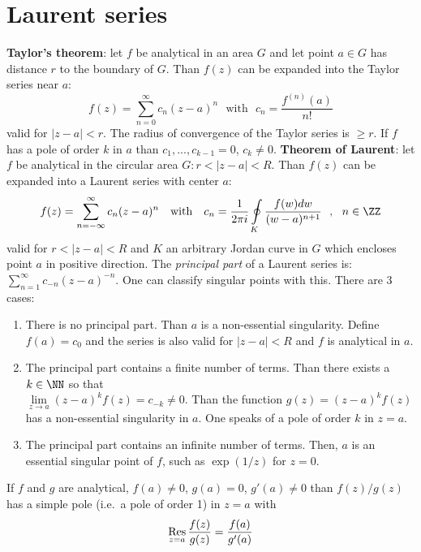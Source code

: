 \section{Laurent series}
{\bf Taylor's theorem}: let $f$ be analytical in an area $G$ and let point
$a\in G$ has distance $r$ to the boundary of $G$. Than $f(z)$ can be expanded
into the Taylor series near $a$:
\[
f(z)=\sum_{n=0}^\infty c_n(z-a)^n~~~\mbox{with}~~~c_n=\frac{f^{(n)}(a)}{n!}
\]
valid for $|z-a|<r$. The radius of convergence of the Taylor series is $\geq r$.
If $f$ has a pole of order $k$ in $a$ than $c_1,...,c_{k-1}=0$, $c_k\neq0$.
\npar
{\bf Theorem of Laurent}: let $f$ be analytical in the circular area
$G:r<|z-a|<R$. Than $f(z)$ can be expanded into a Laurent series with center
$a$:
\[
f(z)=\sum_{n=-\infty}^\infty c_n(z-a)^n~~~\mbox{with}~~~
c_n=\frac{1}{2\pi i}\oint\limits_K\frac{f(w)dw}{(w-a)^{n+1}}~~,~~n\in\ZZ
\]
valid for $r<|z-a|<R$ and $K$ an arbitrary Jordan curve in $G$ which encloses
point $a$ in positive direction.
\npar
The {\it principal part} of a Laurent series is: $\sum\limits_{n=1}^\infty c_{-n}(z-a)^{-n}$.
One can classify singular points with this. There are 3 cases:
\begin{enumerate}
\item There is no principal part. Than $a$ is a non-essential singularity.
      Define $f(a)=c_0$ and the series is also valid for $|z-a|<R$ and
      $f$ is analytical in $a$.
\item The principal part contains a finite number of terms. Than there exists
      a $k\in\NN$ so that\\ $\lim\limits_{z\rightarrow a}(z-a)^kf(z)=c_{-k}\neq0$.
      Than the function $g(z)=(z-a)^kf(z)$ has a non-essential singularity in
      $a$. One speaks of a pole of order $k$ in $z=a$.
\item The principal part contains an infinite number of terms. Then, $a$ is an
      essential singular point of $f$, such as $\exp(1/z)$ for $z=0$.
\end{enumerate}
If $f$ and $g$ are analytical, $f(a)\neq0$, $g(a)=0$, $g'(a)\neq0$ than
$f(z)/g(z)$ has a simple pole (i.e.\ a pole of order 1) in $z=a$ with
\[
\mathop{\rm Res}\limits_{z=a}\frac{f(z)}{g(z)}=\frac{f(a)}{g'(a)}
\]


